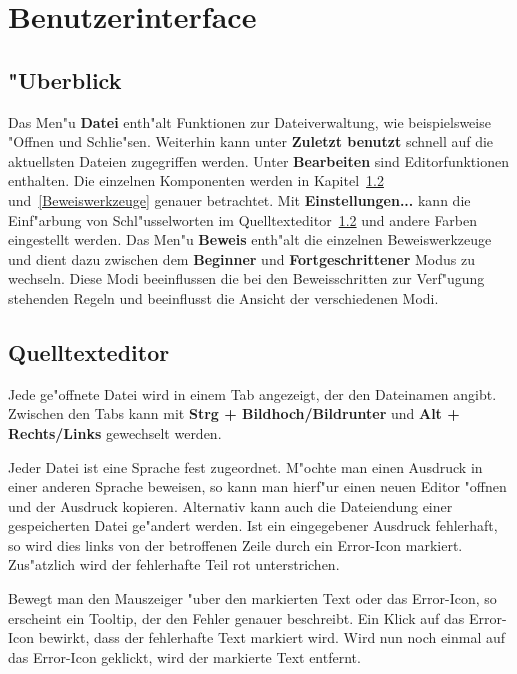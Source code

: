 
\chapter{Benutzerinterface}

\section{"Uberblick} 

Das Men"u {\bf Datei} enth"alt Funktionen zur Dateiverwaltung, wie
beispielsweise "Offnen und Schlie"sen. Weiterhin kann unter {\bf
Zuletzt benutzt} schnell auf die aktuellsten Dateien zugegriffen
werden. Unter {\bf Bearbeiten} sind Editorfunktionen enthalten. Die
einzelnen Komponenten werden in Kapitel~\ref{Qelltexteditor}
und~\ref{Beweiswerkzeuge} genauer betrachtet. Mit {\bf
Einstellungen...} kann die
Einf"arbung von Schl"usselworten im
Quelltexteditor~\ref{Qelltexteditor} und andere Farben eingestellt werden. Das Men"u {\bf Beweis}
enth"alt die einzelnen Beweiswerkzeuge und dient dazu zwischen dem
{\bf Beginner} und {\bf Fortgeschrittener} Modus zu wechseln. Diese
Modi beeinflussen die bei den Beweisschritten zur Verf"ugung
stehenden Regeln und beeinflusst die Ansicht der verschiedenen Modi. 

\section {Quelltexteditor}
\label{Qelltexteditor} Jede ge"offnete Datei wird in einem Tab
angezeigt, der den Dateinamen angibt. Zwischen den Tabs kann mit
{\bf Strg + Bildhoch/Bildrunter} und {\bf Alt + Rechts/Links}
gewechselt werden.

Jeder Datei ist eine Sprache fest zugeordnet. M"ochte man einen
Ausdruck in einer anderen Sprache beweisen, so kann man hierf"ur
einen neuen Editor "offnen und der Ausdruck kopieren. Alternativ
kann auch die Dateiendung einer gespeicherten Datei ge"andert
werden. Ist ein eingegebener Ausdruck fehlerhaft, so wird dies links
von der betroffenen Zeile durch ein Error-Icon markiert. Zus"atzlich 
wird der fehlerhafte Teil rot unterstrichen. 

Bewegt man den Mauszeiger "uber den markierten Text oder das Error-Icon,
so erscheint ein Tooltip, der den Fehler genauer beschreibt. Ein Klick
auf das Error-Icon bewirkt, dass der fehlerhafte Text markiert wird. Wird
nun noch einmal auf das Error-Icon geklickt, wird der markierte Text
entfernt.

